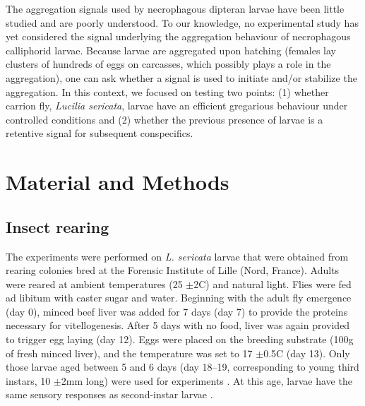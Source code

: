 The aggregation signals used by necrophagous dipteran larvae have been little studied and are poorly understood. To our knowledge, no experimental study has yet considered the signal underlying the aggregation behaviour of necrophagous calliphorid larvae. Because larvae are aggregated upon hatching (females lay clusters of hundreds of eggs on carcasses, which possibly plays a role in the aggregation), one can ask whether a signal is used to initiate and/or stabilize the aggregation. In this context, we focused on testing two points: (1) whether carrion fly, \textit{Lucilia sericata}, larvae have an efficient gregarious behaviour under controlled conditions and (2) whether the previous presence of larvae is a retentive signal for subsequent conspecifics.


\section{Material and Methods}


\subsection{Insect rearing}
The experiments were performed on \textit{L. sericata} larvae that were obtained from rearing colonies bred at the Forensic Institute of Lille (Nord, France). Adults were reared at ambient temperatures (25 $\pm$2C) and natural light. Flies were fed ad libitum with caster sugar and water. Beginning with the adult fly emergence (day 0), minced beef liver was added for 7 days (day 7) to provide the proteins necessary for vitellogenesis. After 5 days with no food, liver was again provided to trigger egg laying (day 12). Eggs were placed on the breeding substrate (100g of fresh minced liver), and the temperature was set to 17 $\pm$0.5C (day 13). Only those larvae aged between 5 and 6 days (day 18–19, corresponding to young third instars, 10 $\pm$2mm long) were used for experiments \citep{grassberger_effect_2001}. At this age, larvae have the same sensory responses as second-instar larvae \citep{cobb_what_1999}.


